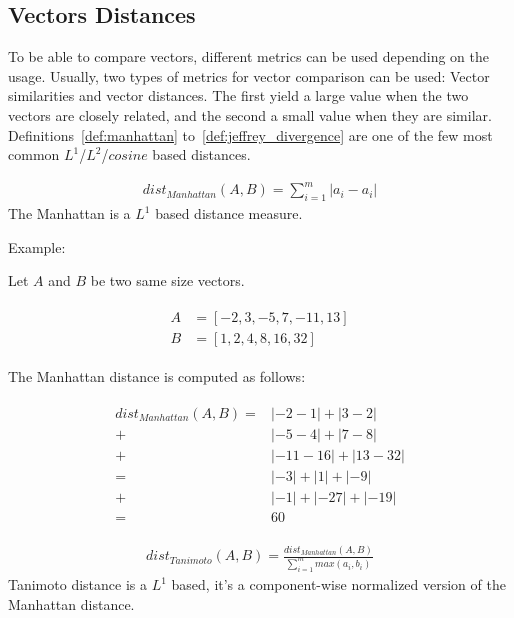 \subsection{Vectors Distances \label{sec:vectors_distances}}

To be able to compare vectors, different metrics can be used depending on the usage.
Usually, two types of metrics for vector comparison can be used: Vector similarities and vector distances.
The first yield a large value when the two vectors are closely related, and the second a small value when they are similar.
Definitions~\ref{def:manhattan} to~\ref{def:jeffrey_divergence} are one of the few most common $L^1$/$L^2$/$cosine$ based distances.

\begin{definition}
  \begin{gather*}
    dist_{Manhattan}(A, B) = \sum_{i=1}^{m} |a_i - a_i|
  \end{gather*}
  The Manhattan is a $L^1$ based distance measure.

  Example:

  Let $A$ and $B$ be two same size vectors.

  \begin{gather*}
    \begin{aligned}
      A &= \left[-2, 3, -5, 7, -11, 13 \right] \\
      B &= \left[1, 2, 4, 8, 16, 32 \right]
    \end{aligned}
  \end{gather*}

  The Manhattan distance is computed as follows:

  \begin{gather*}
    \begin{aligned}
      dist_{Manhattan}(A, B) =& |-2 - 1| + |3 - 2| \\
                             +& |-5 - 4| + |7 - 8| \\
                             +& |-11 - 16| + |13 - 32| \\
                             =& |-3| + |1| + |-9| \\
                             +& |-1| + |-27| + |-19| \\
                             =& 60
    \end{aligned}
  \end{gather*}
\end{definition}

\begin{definition}
  \begin{gather*}
    dist_{Tanimoto}(A, B) = \frac{dist_{Manhattan}(A, B)}{\sum_{i=1}^{m} max(a_i, b_i)}
  \end{gather*}
  Tanimoto distance is a $L^1$ based, it's a component-wise normalized version of the Manhattan distance.
\end{definition}

